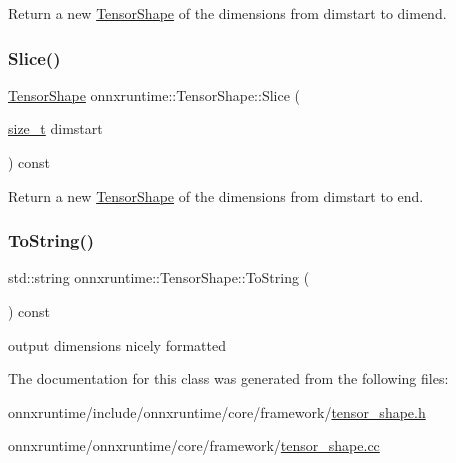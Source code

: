 Return a new \mbox{\hyperlink{classonnxruntime_1_1TensorShape}{Tensor\+Shape}} of the dimensions from dimstart to dimend. \mbox{\label{classonnxruntime_1_1TensorShape_aa4a71819ef5121d26e404e2efd022623}} 
\subsubsection{\texorpdfstring{Slice()}{Slice()}\hspace{0.1cm}{\footnotesize\ttfamily [2/2]}}
{\footnotesize\ttfamily \mbox{\hyperlink{classonnxruntime_1_1TensorShape}{Tensor\+Shape}} onnxruntime\+::\+Tensor\+Shape\+::\+Slice (\begin{DoxyParamCaption}\item[{\mbox{\hyperlink{mlasi_8h_a503efbc1c6e50825320ad909366b78ab}{size\+\_\+t}}}]{dimstart }\end{DoxyParamCaption}) const}

Return a new \mbox{\hyperlink{classonnxruntime_1_1TensorShape}{Tensor\+Shape}} of the dimensions from dimstart to end. \mbox{\label{classonnxruntime_1_1TensorShape_a3e0292984f1378d4b6c8bf58550da147}} 
\subsubsection{\texorpdfstring{To\+String()}{ToString()}}
{\footnotesize\ttfamily std\+::string onnxruntime\+::\+Tensor\+Shape\+::\+To\+String (\begin{DoxyParamCaption}{ }\end{DoxyParamCaption}) const}

output dimensions nicely formatted 

The documentation for this class was generated from the following files\+:\begin{DoxyCompactItemize}
\item 
onnxruntime/include/onnxruntime/core/framework/\mbox{\hyperlink{tensor__shape_8h}{tensor\+\_\+shape.\+h}}\item 
onnxruntime/onnxruntime/core/framework/\mbox{\hyperlink{tensor__shape_8cc}{tensor\+\_\+shape.\+cc}}\end{DoxyCompactItemize}
